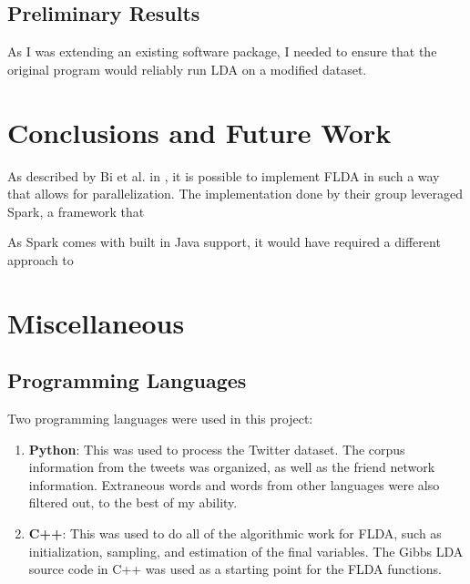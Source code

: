 \documentclass[a4paper]{article}
\begin{document}
\subsection{Preliminary Results}
As I was extending an existing software package, I needed to ensure that the original program would reliably run LDA on a modified dataset.


\section{Conclusions and Future Work}
\label{sec:conc}

As described by Bi et al. in \cite{flda}, it is possible to implement FLDA in such a way that allows for parallelization. The implementation done by their group leveraged Spark, a framework that 

As Spark comes with built in Java support, it would have required a different approach to 

\section{Miscellaneous}
\label{sec:misc}
\subsection{Programming Languages}
Two programming languages were used in this project:
\begin{enumerate}
\item \textbf{Python}: This was used to process the Twitter dataset. The corpus information from the tweets was organized, as well as the friend network information. Extraneous words and words from other languages were also filtered out, to the best of my ability.
\item \textbf{C++}: This was used to do all of the algorithmic work for FLDA, such as initialization, sampling, and estimation of the final variables. The Gibbs LDA source code in C++ was used as a starting point for the FLDA functions.
\end{enumerate}

\end{document}
